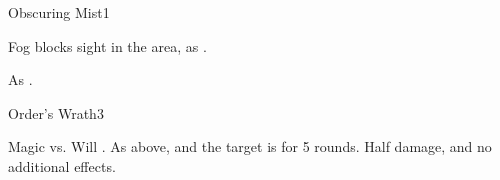 \begin{spellsection}{Obscuring Mist}{1}
\begin{spellheader}
\end{spellheader}
\begin{spellcontent}
    \begin{spelltargetinginfo}
    \end{spelltargetinginfo}
    \begin{spelleffects}
        \spelleffect Fog blocks sight in the area, as .
        \spelldur \durshort
    \end{spelleffects}
\end{spellcontent}
\begin{spellfooter}
    \spellnotes As .
\end{spellfooter}
\end{spellsection}

\begin{spellsection}{Order's Wrath}{3}
\begin{spellheader}
\end{spellheader}
\begin{spellcontent}
    \begin{spelltargetinginfo}
    \end{spelltargetinginfo}
    \begin{spelleffects}
        \begin{spellattack}{Magic vs. Will}
            \spellsuccess {}.
            \spellcritical As above, and the target is \immobilized for 5 rounds.
            \spellfailure Half damage, and no additional effects.
        \end{spellattack}
    \end{spelleffects}
\end{spellcontent}
\begin{spellfooter}
\end{spellfooter}
\end{spellsection}

